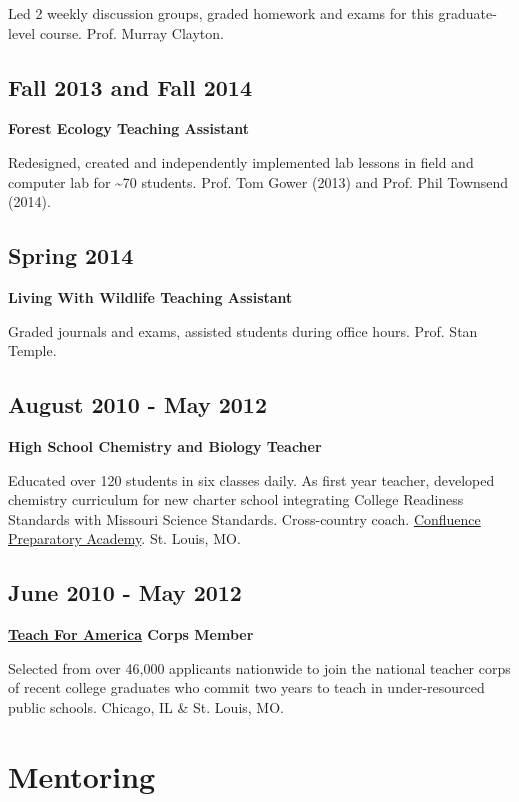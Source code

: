 \documentclass{article}
\begin{document}
Led 2 weekly discussion groups, graded homework and exams for this
graduate-level course. Prof. Murray Clayton.

\subsection*{Fall 2013 and Fall 2014}
\label{sec:org08e2382}
\textbf{Forest Ecology Teaching Assistant}

Redesigned, created and independently implemented lab lessons in field and computer lab for \textasciitilde{}70
students.  Prof. Tom Gower (2013) and Prof. Phil Townsend (2014).

\subsection*{Spring 2014}
\label{sec:orgd3c4fdc}
\textbf{Living With Wildlife Teaching Assistant}

Graded journals and exams, assisted students during office hours.
Prof. Stan Temple.

\subsection*{August 2010 - May 2012}
\label{sec:org3eef89b}
\textbf{High School Chemistry and Biology Teacher}

Educated over 120 students in six classes daily. As first year
teacher, developed chemistry curriculum for new charter school
integrating College Readiness Standards with Missouri Science
Standards. Cross-country coach. \href{https://www.google.com/search?q=Confluence+Preparatory+Academy+St.+Louis\&oq=Confluence+Prep+Academy+St.+Louis\&aqs=chrome..69i57.7294j0j8\&sourceid=chrome\&ie=UTF-8\#q=Confluence+Prep+Academy+High+School+St.+Louis}{Confluence Preparatory Academy}. St. Louis, MO.

\subsection*{June 2010 - May 2012}
\label{sec:org05555fc}
\textbf{\href{https://www.teachforamerica.org/}{Teach For America} Corps Member}

Selected from over 46,000 applicants nationwide to join the national
teacher corps of recent college graduates who commit two years to
teach in under-resourced public schools.  Chicago, IL \& St. Louis, MO.

\section*{Mentoring}
\label{sec:orgf2cca78}
\end{document}
